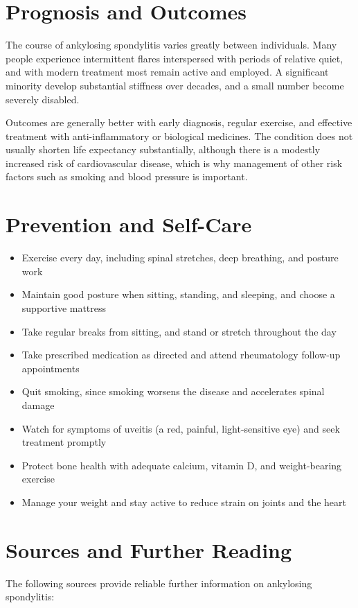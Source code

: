 \section*{Prognosis and Outcomes}
The course of ankylosing spondylitis varies greatly between individuals. Many people experience intermittent flares interspersed with periods of relative quiet, and with modern treatment most remain active and employed. A significant minority develop substantial stiffness over decades, and a small number become severely disabled.

Outcomes are generally better with early diagnosis, regular exercise, and effective treatment with anti-inflammatory or biological medicines. The condition does not usually shorten life expectancy substantially, although there is a modestly increased risk of cardiovascular disease, which is why management of other risk factors such as smoking and blood pressure is important.

\section*{Prevention and Self-Care}
\begin{itemize}
    \item Exercise every day, including spinal stretches, deep breathing, and posture work
    \item Maintain good posture when sitting, standing, and sleeping, and choose a supportive mattress
    \item Take regular breaks from sitting, and stand or stretch throughout the day
    \item Take prescribed medication as directed and attend rheumatology follow-up appointments
    \item Quit smoking, since smoking worsens the disease and accelerates spinal damage
    \item Watch for symptoms of uveitis (a red, painful, light-sensitive eye) and seek treatment promptly
    \item Protect bone health with adequate calcium, vitamin D, and weight-bearing exercise
    \item Manage your weight and stay active to reduce strain on joints and the heart
\end{itemize}

\section*{Sources and Further Reading}
The following sources provide reliable further information on ankylosing spondylitis:


